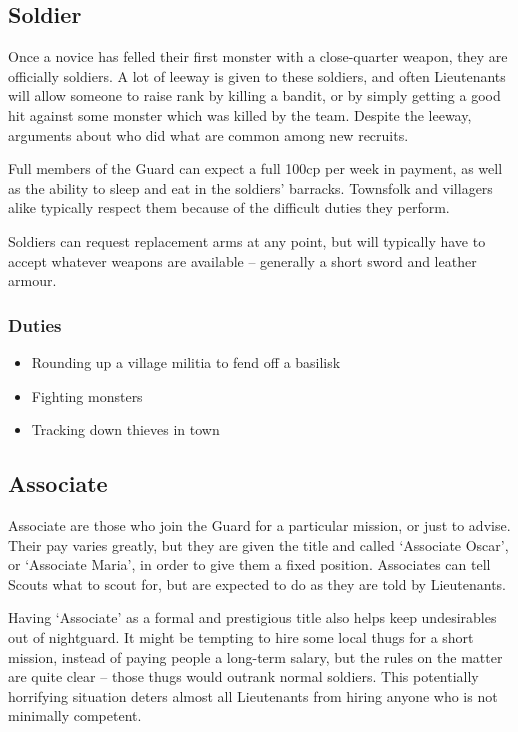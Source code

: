 \begin{multicols}{2}
\subsection{Soldier}

Once a novice has felled their first monster with a close-quarter weapon, they are officially soldiers.
A lot of leeway is given to these soldiers, and often Lieutenants will allow someone to raise rank by killing a bandit, or by simply getting a good hit against some monster which was killed by the team.
Despite the leeway, arguments about who did what are common among new recruits.

Full members of the Guard can expect a full 100cp per week in payment, as well as the ability to sleep and eat in the soldiers' barracks.
Townsfolk and villagers alike typically respect them because of the difficult duties they perform.

Soldiers can request replacement arms at any point, but will typically have to accept whatever weapons are available -- generally a short sword and leather armour.

\subsubsection{Duties}

\begin{itemize}

	\item{Rounding up a village militia to fend off a basilisk}
	\item{Fighting monsters}
	\item{Tracking down thieves in town}
\end{itemize}

\subsection{Associate}

Associate are those who join the Guard for a particular mission, or just to advise.
Their pay varies greatly, but they are given the title and called `Associate Oscar', or `Associate Maria', in order to give them a fixed position.
Associates can tell Scouts what to scout for, but are expected to do as they are told by Lieutenants.

Having `Associate' as a formal and prestigious title also helps keep undesirables out of \gls{nightguard}.
It might be tempting to hire some local thugs for a short mission, instead of paying people a long-term salary, but the rules on the matter are quite clear -- those thugs would outrank normal soldiers.
This potentially horrifying situation deters almost all Lieutenants from hiring anyone who is not minimally competent.


\end{multicols}
